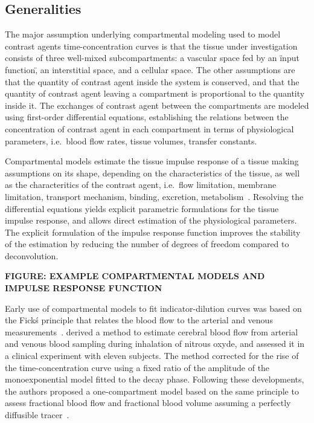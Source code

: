 \subsection{Generalities}
The major assumption underlying compartmental modeling used to model contrast agents time-concentration curves is that the tissue under investigation consists of three well-mixed subcompartments: a vascular space fed by an \"input function\", an interstitial space, and a cellular space.
The other assumptions are that the quantity of contrast agent inside the system is conserved, and that the quantity of contrast agent leaving a compartment is proportional to the quantity inside it.
The exchanges of contrast agent between the compartments are modeled using first-order differential equations, establishing the relations between the concentration of contrast agent in each compartment in terms of physiological parameters, i.e.~blood flow rates, tissue volumes, transfer constants. 

Compartmental models estimate the tissue impulse response of a tissue making assumptions on its shape, depending on the characteristics of the tissue, as well as the characteritics of the contrast agent, i.e.~flow limitation, membrane limitation, transport mechanism, binding, excretion, metabolism~\cite{Gerlowski:1983tz}.
Resolving the differential equations yields explicit parametric formulations for the tissue impulse response, and allows direct estimation of the physiological parameters.
The explicit formulation of the impulse response function improves the stability of the estimation by reducing the number of degrees of freedom compared to deconvolution.

\textbf{FIGURE: EXAMPLE COMPARTMENTAL MODELS AND IMPULSE RESPONSE FUNCTION}

Early use of compartmental models to fit indicator-dilution curves was based on the Fick\'s principle that relates the blood flow to the arterial and venous measurements~\cite{Kety:1944iv,Kety:1948je}.
\citet{Kety:1944iv} derived a method to estimate cerebral blood flow from arterial and venous blood sampling during inhalation of nitrous oxyde, and assessed it in a clinical experiment with eleven subjects.
The method corrected for the rise of the time-concentration curve using a fixed ratio of the amplitude of the monoexponential model fitted to the decay phase. 
Following these developments, the authors proposed a one-compartment model based on the same principle to assess fractional blood flow and fractional blood volume assuming a perfectly diffusible tracer~\cite{Kety:1951tp}.

